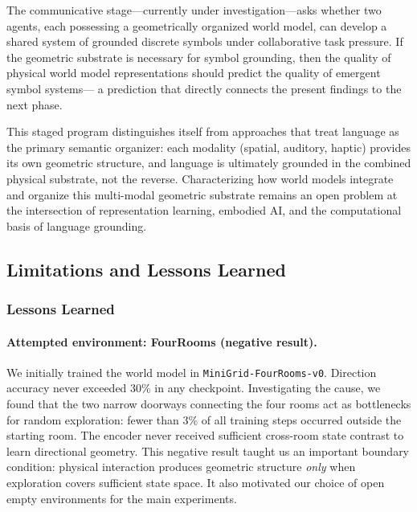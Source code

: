 \documentclass{article}
\begin{document}
The communicative stage---currently under investigation---asks whether
two agents, each possessing a geometrically organized world model,
can develop a shared system of grounded discrete symbols under
collaborative task pressure.
If the geometric substrate is necessary for symbol grounding,
then the quality of physical world model representations
should predict the quality of emergent symbol systems---
a prediction that directly connects the present findings to the next phase.

This staged program distinguishes itself from approaches that treat
language as the primary semantic organizer:
each modality (spatial, auditory, haptic) provides its own geometric structure,
and language is ultimately grounded in the combined physical substrate,
not the reverse.
Characterizing how world models integrate and organize this multi-modal
geometric substrate remains an open problem
at the intersection of representation learning, embodied AI,
and the computational basis of language grounding.


\subsection{Limitations and Lessons Learned}

\subsubsection*{Lessons Learned}

\paragraph{Attempted environment: FourRooms (negative result).}
We initially trained the world model in \texttt{MiniGrid-FourRooms-v0}.
Direction accuracy never exceeded 30\% in any checkpoint.
Investigating the cause, we found that the two narrow doorways
connecting the four rooms act as bottlenecks for random exploration:
fewer than 3\% of all training steps occurred outside the starting
room. The encoder never received sufficient cross-room state contrast
to learn directional geometry.
This negative result taught us an important boundary condition:
physical interaction produces geometric structure \emph{only} when
exploration covers sufficient state space.
It also motivated our choice of open empty environments
for the main experiments.
\end{document}
